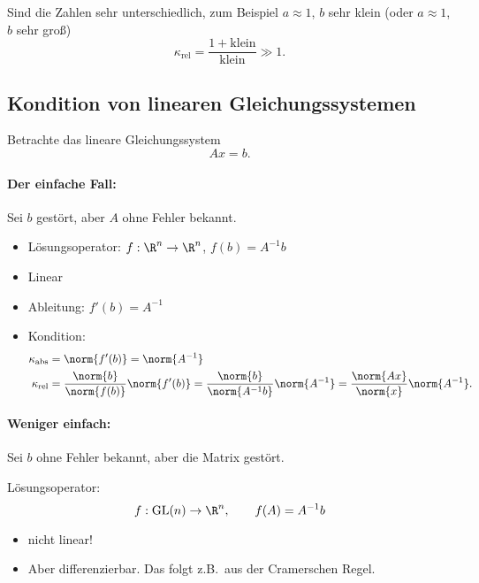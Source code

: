 \bigskip

Sind die Zahlen sehr unterschiedlich, zum Beispiel $a\approx 1$, $b$ sehr klein (oder $a\approx 1$, $b$ sehr groß)
\begin{equation*}
\kappa_\text{rel} = \frac{1+\text{klein}}{\text{klein}} \gg 1.
\end{equation*}

\subsection{Kondition von linearen Gleichungssystemen}

Betrachte das lineare Gleichungssystem
\begin{equation*}
 Ax = b.
\end{equation*}

\paragraph{Der einfache Fall:} Sei $b$ gestört, aber $A$ ohne Fehler bekannt.
\begin{itemize}
\item Lösungsoperator: $f : \R^n \to \R^n$, \qquad $ f(b) = A^{-1}b$
\item Linear

\item Ableitung: $ f'(b) = A^{-1}$

\item Kondition:
   \begin{align*}
    \kappa_\text{abs} &= \norm{f'(b)} = \norm{A^{-1}} \\
    \kappa_\text{rel} &= \frac{\norm{b}}{\norm{f(b)}}\norm{f'(b)} = \frac{\norm{b}}{\norm{A^{-1}b}}\norm{A^{-1}}= \frac{\norm{Ax}}{\norm{x}}\norm{A^{-1}}.
   \end{align*}
\end{itemize}

\paragraph{Weniger einfach:} Sei $b$ ohne Fehler bekannt, aber die Matrix gestört.

Lösungsoperator:
\begin{equation*}
  f : \text{GL}(n) \to \R^n,
  \qquad
  f(A) = A^{-1}b
\end{equation*}
\begin{itemize}
\item nicht linear!
\item Aber differenzierbar. Das folgt z.B.\ aus der Cramerschen Regel.
\end{itemize}

